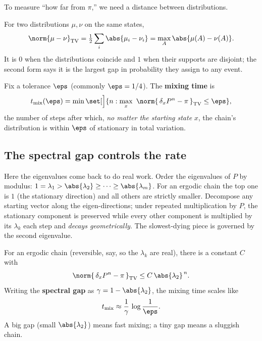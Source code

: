 To measure ``how far from $\pi$,'' we need a distance between distributions.

\begin{definition}
\label{ch24:def-tv}
For two distributions $\mu,\nu$ on the same states,
\[
  \norm{\mu - \nu}_{\mathrm{TV}} = \tfrac12 \sum_i \abs{\mu_i - \nu_i}
  = \max_{A} \abs{\mu(A) - \nu(A)} .
\]
It is $0$ when the distributions coincide and $1$ when their supports are disjoint;
the second form says it is the largest gap in probability they assign to any event.
\end{definition}

\begin{definition}
\label{ch24:def-mixing}
Fix a tolerance $\eps$ (commonly $\eps = 1/4$). The \textbf{mixing time} is
\[
  t_{\mathrm{mix}}(\eps) = \min\set[\Big]{ n : \max_{x}\ \norm{\,\delta_x P^n - \pi\,}_{\mathrm{TV}} \le \eps },
\]
the number of steps after which, \emph{no matter the starting state} $x$, the
chain's distribution is within $\eps$ of stationary in total variation.
\end{definition}

\subsection{The spectral gap controls the rate}

Here the eigenvalues come back to do real work. Order the eigenvalues of $P$ by
modulus: $1 = \lambda_1 > \abs{\lambda_2} \ge \cdots \ge \abs{\lambda_m}$. For an
ergodic chain the top one is $1$ (the stationary direction) and all others are
strictly smaller. Decompose any starting vector along the eigen-directions; under
repeated multiplication by $P$, the stationary component is preserved while every
other component is multiplied by its $\lambda_k$ each step and \emph{decays
geometrically}. The slowest-dying piece is governed by the second eigenvalue.

\begin{theorem}
\label{ch24:thm-spectral}
For an ergodic chain (reversible, say, so the $\lambda_k$ are real), there is a
constant $C$ with
\[
  \norm{\,\delta_x P^n - \pi\,}_{\mathrm{TV}} \le C\,\abs{\lambda_2}^{\,n}.
\]
Writing the \textbf{spectral gap} as $\gamma = 1 - \abs{\lambda_2}$, the mixing
time scales like
\[
  t_{\mathrm{mix}} \approx \frac{1}{\gamma}\,\log\frac{1}{\eps}.
\]
A big gap (small $\abs{\lambda_2}$) means fast mixing; a tiny gap means a sluggish
chain.
\end{theorem}

